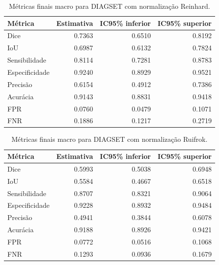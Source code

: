 \begin{table}[!htb]
\centering
\caption{Métricas finais macro para DIAGSET com normalização Reinhard.}
\label{tab:results_diagset-macro-reinhard}
\small
\begin{tabular}{lrrr}
\toprule
Métrica & Estimativa & IC95\% inferior & IC95\% superior \\
\midrule
Dice & 0.7363 & 0.6510 & 0.8192 \\
IoU & 0.6987 & 0.6132 & 0.7824 \\
Sensibilidade & 0.8114 & 0.7281 & 0.8783 \\
Especificidade & 0.9240 & 0.8929 & 0.9521 \\
Precisão & 0.6154 & 0.4912 & 0.7386 \\
Acurácia & 0.9143 & 0.8831 & 0.9418 \\
FPR & 0.0760 & 0.0479 & 0.1071 \\
FNR & 0.1886 & 0.1217 & 0.2719 \\
\bottomrule
\end{tabular}
\end{table}


\begin{table}[!htb]
\centering
\caption{Métricas finais macro para DIAGSET com normalização Ruifrok.}
\label{tab:results_diagset-macro-ruifrok}
\small
\begin{tabular}{lrrr}
\toprule
Métrica & Estimativa & IC95\% inferior & IC95\% superior \\
\midrule
Dice & 0.5993 & 0.5038 & 0.6948 \\
IoU & 0.5584 & 0.4667 & 0.6518 \\
Sensibilidade & 0.8707 & 0.8321 & 0.9064 \\
Especificidade & 0.9228 & 0.8932 & 0.9484 \\
Precisão & 0.4941 & 0.3844 & 0.6078 \\
Acurácia & 0.9188 & 0.8926 & 0.9421 \\
FPR & 0.0772 & 0.0516 & 0.1068 \\
FNR & 0.1293 & 0.0936 & 0.1679 \\
\bottomrule
\end{tabular}
\end{table}

